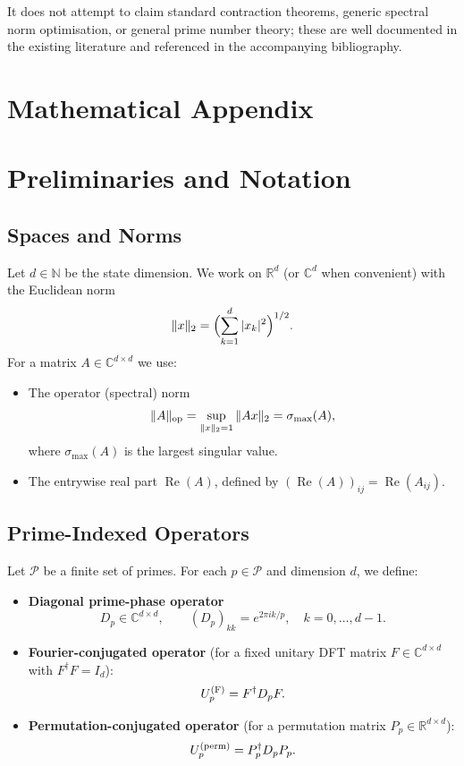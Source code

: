 \documentclass[11pt,letterpaper]{article}
\begin{document}
It does not attempt to claim standard contraction theorems, generic spectral
norm optimisation, or general prime number theory; these are well documented
in the existing literature and referenced in the accompanying bibliography.

\appendix
\section*{Mathematical Appendix}

\section{Preliminaries and Notation}

\subsection{Spaces and Norms}

Let \(d \in \mathbb{N}\) be the state dimension. We work on
\(\mathbb{R}^d\) (or \(\mathbb{C}^d\) when convenient) with the Euclidean norm
\[
  \|x\|_2 = \Bigl(\sum_{k=1}^d |x_k|^2\Bigr)^{1/2}.
\]
For a matrix \(A \in \mathbb{C}^{d\times d}\) we use:

\begin{itemize}[leftmargin=*]
  \item The operator (spectral) norm
  \[
    \|A\|_{\rm op}
    = \sup_{\|x\|_2 = 1} \|Ax\|_2
    = \sigma_{\max}(A),
  \]
  where \(\sigma_{\max}(A)\) is the largest singular value.
  \item The entrywise real part \(\operatorname{Re}(A)\), defined by
  \((\operatorname{Re}(A))_{ij} = \operatorname{Re}(A_{ij})\).
\end{itemize}

\subsection{Prime-Indexed Operators}

Let \(\mathcal{P}\) be a finite set of primes. For each \(p \in \mathcal{P}\)
and dimension \(d\), we define:

\begin{itemize}[leftmargin=*]
  \item \textbf{Diagonal prime-phase operator}
  \[
    D_p \in \mathbb{C}^{d\times d}, \qquad (D_p)_{kk} = e^{2\pi i k/p},
    \quad k = 0,\dots,d-1.
  \]
  \item \textbf{Fourier-conjugated operator} (for a fixed unitary DFT matrix
  \(F \in \mathbb{C}^{d\times d}\) with \(F^\dagger F = I_d\)):
  \[
    U_p^{\rm (F)} = F^\dagger D_p F.
  \]
  \item \textbf{Permutation-conjugated operator} (for a permutation matrix
  \(P_p \in \mathbb{R}^{d\times d}\)):
  \[
    U_p^{\rm (perm)} = P_p^\dagger D_p P_p.
  \]
\end{itemize}
\end{document}
